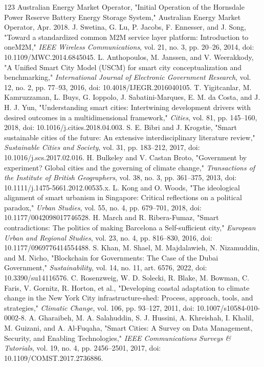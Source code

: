 \documentclass[journal]{IEEEtran}
\begin{document}
\begin{thebibliography}{123}
 Australian Energy Market Operator, "Initial Operation of the Hornsdale Power Reserve Battery Energy Storage System," Australian Energy Market Operator, Apr. 2018.
 J. Swetina, G. Lu, P. Jacobs, F. Ennesser, and J. Song, "Toward a standardized common M2M service layer platform: Introduction to oneM2M," \emph{IEEE Wireless Communications}, vol. 21, no. 3, pp. 20--26, 2014, doi: 10.1109/MWC.2014.6845045.
 L. Anthopoulos, M. Janssen, and V. Weerakkody, "A Unified Smart City Model (USCM) for smart city conceptualization and benchmarking," \emph{International Journal of Electronic Government Research}, vol. 12, no. 2, pp. 77--93, 2016, doi: 10.4018/IJEGR.2016040105.
 T. Yigitcanlar, M. Kamruzzaman, L. Buys, G. Ioppolo, J. Sabatini-Marques, E. M. da Costa, and J. H. J. Yun, "Understanding smart cities: Intertwining development drivers with desired outcomes in a multidimensional framework," \emph{Cities}, vol. 81, pp. 145--160, 2018, doi: 10.1016/j.cities.2018.04.003.
 S. E. Bibri and J. Krogstie, "Smart sustainable cities of the future: An extensive interdisciplinary literature review," \emph{Sustainable Cities and Society}, vol. 31, pp. 183--212, 2017, doi: 10.1016/j.scs.2017.02.016.
 H. Bulkeley and V. Castan Broto, "Government by experiment? Global cities and the governing of climate change," \emph{Transactions of the Institute of British Geographers}, vol. 38, no. 3, pp. 361--375, 2013, doi: 10.1111/j.1475-5661.2012.00535.x.
 L. Kong and O. Woods, "The ideological alignment of smart urbanism in Singapore: Critical reflections on a political paradox," \emph{Urban Studies}, vol. 55, no. 4, pp. 679--701, 2018, doi: 10.1177/0042098017746528.
 H. March and R. Ribera-Fumaz, "Smart contradictions: The politics of making Barcelona a Self-sufficient city," \emph{European Urban and Regional Studies}, vol. 23, no. 4, pp. 816--830, 2016, doi: 10.1177/0969776414554488.
 S. Khan, M. Shael, M. Majdalawieh, N. Nizamuddin, and M. Nicho, "Blockchain for Governments: The Case of the Dubai Government," \emph{Sustainability}, vol. 14, no. 11, art. 6576, 2022, doi: 10.3390/su14116576.
 C. Rosenzweig, W. D. Solecki, R. Blake, M. Bowman, C. Faris, V. Gornitz, R. Horton, et al., "Developing coastal adaptation to climate change in the New York City infrastructure-shed: Process, approach, tools, and strategies," \emph{Climatic Change}, vol. 106, pp. 93--127, 2011, doi: 10.1007/s10584-010-0002-8.
 A. Gharaibeh, M. A. Salahuddin, S. J. Hussini, A. Khreishah, I. Khalil, M. Guizani, and A. Al-Fuqaha, "Smart Cities: A Survey on Data Management, Security, and Enabling Technologies," \emph{IEEE Communications Surveys \& Tutorials}, vol. 19, no. 4, pp. 2456--2501, 2017, doi: 10.1109/COMST.2017.2736886.

\end{thebibliography}
\end{document}
